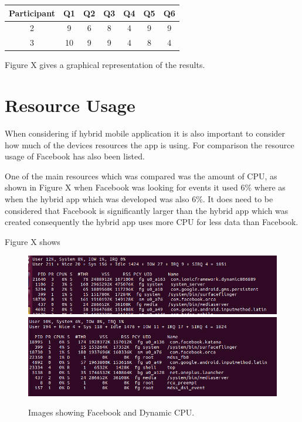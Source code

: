 \begin{center} 
 \begin{tabular}{||c c c c c c c||}  
 \hline
  \hline
 Participant & Q1 & Q2 & Q3 & Q4 & Q5 & Q6 \\
 \hline
 2 & 9 & 6 & 8 & 4 & 9 & 9 \\
 \hline
 3 & 10 & 9 & 9 & 4 & 8 & 4 \\
 \hline
 \hline
 \end{tabular}
 \end{center}

 Figure X gives a graphical representation of the results. 

 \section{Resource Usage}
 When considering if hybrid mobile application it is also important to consider how much of the devices resources the app is using. For comparison the resource usage of Facebook has also been listed.

 One of the main resources which was compared was the amount of CPU, as shown in Figure X when Facebook was looking for events it used 6\% where as when the hybrid app which was developed was also 6\%. It does need to be considered that Facebook is significantly larger than the hybrid app which was created consequently the hybrid app uses more CPU for less data than Facebook.

 Figure X shows 

\begin{figure}[H]
\includegraphics[scale=0.45]{images/ram2}
\includegraphics[scale=0.45]{images/ram3}
\caption{Images showing Facebook and Dynamic CPU.}
\end{figure}
